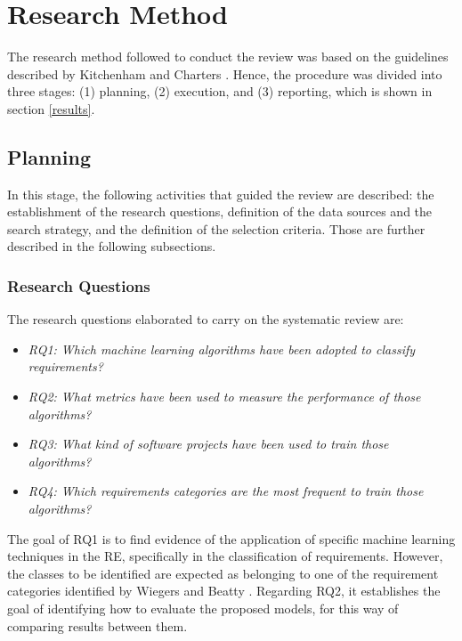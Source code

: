 \documentclass[conference]{IEEEtran}
\begin{document}
\section{Research Method}
\label{method}

The research method followed to conduct the review was based on the guidelines described by Kitchenham and Charters \cite{Kitchenham2007}. Hence, the procedure was divided into three stages: (1) planning, (2) execution, and (3) reporting, which is shown in section \ref{results}.

\subsection{Planning}

In this stage, the following activities that guided the review are described: the establishment of the research questions, definition of the data sources and the search strategy, and the definition of the selection criteria. Those are further described in the following subsections.

\subsubsection{Research Questions}

The research questions elaborated to carry on the systematic review are:

\begin{itemize}
  \item \textit{RQ1: Which machine learning algorithms have been adopted to classify requirements?}
  \item \textit{RQ2: What metrics have been used to measure the performance of those algorithms?}
  \item \textit{RQ3: What kind of software projects have been used to train those algorithms?}
  \item \textit{RQ4: Which requirements categories are the most frequent to train those algorithms?}
\end{itemize}

The goal of RQ1 is to find evidence of the application of specific machine learning techniques in the RE, specifically in the classification of requirements. However, the classes to be identified are expected as belonging to one of the requirement categories identified by Wiegers and Beatty \cite{Wiegers2013}. Regarding RQ2, it establishes the goal of identifying how to evaluate the proposed models, for this way of comparing results between them.
\end{document}
